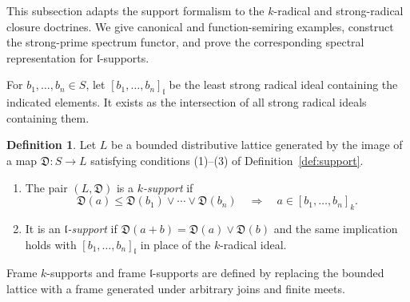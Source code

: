 \documentclass[12pt,leqno]{amsart}
\theoremstyle{definition}
\newtheorem{definition}{Definition}[section]
\numberwithin{equation}{section}
\theoremstyle{remark}
\def\leq{\leqslant}
\begin{document}
This subsection adapts the support formalism to the $k$-radical and strong-radical closure doctrines. We give canonical and function-semiring examples, construct the strong-prime spectrum functor, and prove the corresponding spectral representation for $\mathfrak l$-supports.

For \(b_1,\ldots,b_n\in S\), let
\([b_1,\ldots,b_n]_{\mathfrak l}\) be the least strong radical ideal containing the indicated elements. It exists as the intersection of all strong radical ideals containing them.

\begin{definition}\label{def:k-l-supports}
Let $L$ be a bounded distributive lattice generated by the image of a map
\(\mathfrak D\colon S\to L\) satisfying conditions (1)--(3) of Definition~\ref{def:support}.
\begin{enumerate}
\item The pair \((L,\mathfrak D)\) is a \emph{$k$-support} if
\[
\mathfrak D(a)\leq\mathfrak D(b_1)\vee\cdots\vee\mathfrak D(b_n)
\quad\Longrightarrow\quad
a\in[b_1,\ldots,b_n]_k.
\]
\item It is an \emph{$\mathfrak l$-support} if
\(\mathfrak D(a+b)=\mathfrak D(a)\vee\mathfrak D(b)\) and the same implication holds with
\([b_1,\ldots,b_n]_{\mathfrak l}\) in place of the $k$-radical ideal.
\end{enumerate}
Frame $k$-supports and frame $\mathfrak l$-supports are defined by replacing the bounded lattice with a frame generated under arbitrary joins and finite meets.
\end{definition}
\end{document}

